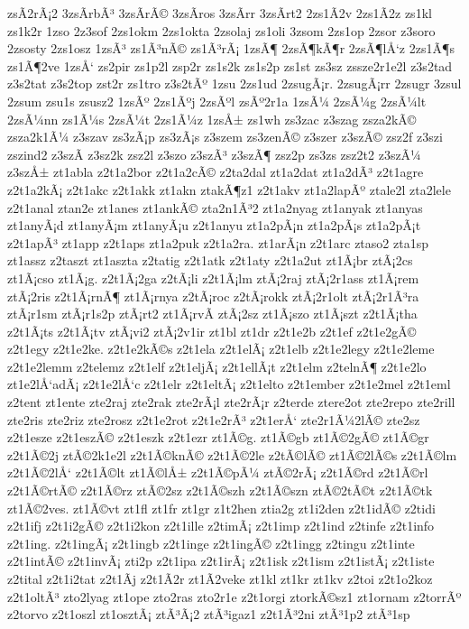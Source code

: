 {zsÃ­2rÃ¡2
3zsÃ­rbÃ³
3zsÃ­rÃ©
3zsÃ­ros
3zsÃ­rr
3zsÃ­rt2
2zs1Ã­2v
2zs1Ã­2z
zs1kl
zs1k2r
1zso
2z3sof
2zs1okm
2zs1okta
2zsolaj
zs1oli
3zsom
2zs1op
2zsor
z3soro
2zsosty
2zs1osz
1zsÃ³
zs1Ã³nÃ©
zs1Ã³rÃ¡
1zsÃ¶
2zsÃ¶kÃ¶r
2zsÃ¶lÅ‘z
2zs1Ã¶s
zs1Ã¶2ve
1zsÅ‘
zs2pir
zs1p2l
zsp2r
zs1s2k
zs1s2p
zs1st
zs3sz
zssze2r1e2l
z3s2tad
z3s2tat
z3s2top
zst2r
zs1tro
z3s2tÃº
1zsu
2zs1ud
2zsugÃ¡r.
2zsugÃ¡rr
2zsugr
3zsul
2zsum
zsu1s
zsusz2
1zsÃº
2zs1Ãºj
2zsÃºl
zsÃº2r1a
1zsÃ¼
2zsÃ¼g
2zsÃ¼lt
2zsÃ¼nn
zs1Ã¼s
2zsÃ¼t
2zs1Ã¼z
1zsÅ±
zs1wh
zs3zac
z3szag
zsza2kÃ©
zsza2k1Ã¼
z3szav
zs3zÃ¡p
zs3zÃ¡s
z3szem
zs3zenÃ©
z3szer
z3szÃ©
zsz2f
z3szi
zszind2
z3szÃ­
z3sz2k
zsz2l
z3szo
z3szÃ³
z3szÃ¶
zsz2p
zs3zs
zsz2t2
z3szÃ¼
z3szÅ±
zt1abla
z2t1a2bor
z2t1a2cÃ©
z2ta2dal
zt1a2dat
zt1a2dÃ³
z2t1agre
z2t1a2kÃ¡
z2t1akc
z2t1akk
zt1akn
ztakÃ¶z1
z2t1akv
zt1a2lapÃº
ztale2l
zta2lele
z2t1anal
ztan2e
zt1anes
zt1ankÃ©
zta2n1Ã³2
zt1a2nyag
zt1anyak
zt1anyas
zt1anyÃ¡d
zt1anyÃ¡m
zt1anyÃ¡u
z2t1anyu
zt1a2pÃ¡n
zt1a2pÃ¡s
zt1a2pÃ¡t
z2t1apÃ³
zt1app
z2t1aps
zt1a2puk
z2t1a2ra.
zt1arÃ¡n
z2t1arc
ztaso2
zta1sp
zt1assz
z2taszt
zt1aszta
z2tatig
z2t1atk
z2t1aty
z2t1a2ut
zt1Ã¡br
ztÃ¡2cs
zt1Ã¡cso
zt1Ã¡g.
z2t1Ã¡2ga
z2tÃ¡li
z2t1Ã¡lm
ztÃ¡2raj
ztÃ¡2r1ass
zt1Ã¡rem
ztÃ¡2ris
z2t1Ã¡rnÃ¶
zt1Ã¡rnya
z2tÃ¡roc
z2tÃ¡rokk
ztÃ¡2r1olt
ztÃ¡2r1Ã³ra
ztÃ¡r1sm
ztÃ¡r1s2p
ztÃ¡rt2
zt1Ã¡rvÃ­
ztÃ¡2sz
zt1Ã¡szo
zt1Ã¡szt
z2t1Ã¡tha
z2t1Ã¡ts
z2t1Ã¡tv
ztÃ¡vi2
ztÃ¡2v1ir
zt1bl
zt1dr
z2t1e2b
z2t1ef
z2t1e2gÃ©
z2t1egy
z2t1e2ke.
z2t1e2kÃ©s
z2t1ela
z2t1elÃ¡
z2t1elb
z2t1e2legy
z2t1e2leme
z2t1e2lemm
z2telemz
z2t1elf
z2t1eljÃ¡
z2t1ellÃ¡t
z2t1elm
z2telnÃ¶
z2t1e2lo
zt1e2lÅ‘adÃ¡
z2t1e2lÅ‘c
z2t1elr
z2t1eltÃ¡
z2t1elto
z2t1ember
z2t1e2mel
z2t1eml
z2tent
zt1ente
zte2raj
zte2rak
zte2rÃ¡l
zte2rÃ¡r
z2terde
ztere2ot
zte2repo
zte2rill
zte2ris
zte2riz
zte2rosz
z2t1e2rot
z2t1e2rÃ³
z2t1erÅ‘
zte2r1Ã¼2lÃ©
zte2sz
z2t1esze
z2t1eszÃ©
z2t1eszk
z2t1ezr
zt1Ã©g.
zt1Ã©gb
zt1Ã©2gÃ©
zt1Ã©gr
z2t1Ã©2j
ztÃ©2k1e2l
z2t1Ã©knÃ©
z2t1Ã©2le
z2tÃ©lÃ©
zt1Ã©2lÃ©s
z2t1Ã©lm
z2t1Ã©2lÅ‘
z2t1Ã©lt
zt1Ã©lÅ±
z2t1Ã©pÃ¼
ztÃ©2rÃ¡
z2t1Ã©rd
z2t1Ã©rl
z2t1Ã©rtÃ©
z2t1Ã©rz
ztÃ©2sz
z2t1Ã©szh
z2t1Ã©szn
ztÃ©2tÃ©t
z2t1Ã©tk
zt1Ã©2ves.
zt1Ã©vt
zt1fl
zt1fr
zt1gr
z1t2hen
ztia2g
zt1i2den
z2t1idÃ©
z2tidi
z2t1ifj
z2t1i2gÃ©
z2t1i2kon
z2t1ille
z2timÃ¡
z2t1imp
z2t1ind
z2tinfe
z2t1info
z2t1ing.
z2t1ingÃ¡
z2t1ingb
z2t1inge
z2t1ingÃ©
z2t1ingg
z2tingu
z2t1inte
z2t1intÃ©
z2t1invÃ¡
zti2p
z2t1ipa
z2t1irÃ¡
z2t1isk
z2t1ism
z2t1istÃ¡
z2t1iste
z2tital
z2t1i2tat
z2t1Ã­j
z2t1Ã­2r
zt1Ã­2veke
zt1kl
zt1kr
zt1kv
z2toi
z2t1o2koz
z2t1oltÃ³
zto2lyag
zt1ope
zto2ras
zto2r1e
z2t1orgi
ztorkÃ©sz1
zt1ornam
z2torrÃº
z2torvo
z2t1oszl
zt1osztÃ¡
ztÃ³Ã¡2
ztÃ³igaz1
z2t1Ã³2ni
ztÃ³1p2
ztÃ³1sp
}
